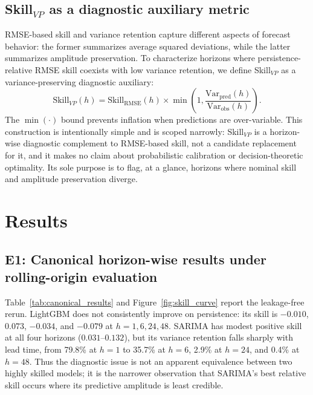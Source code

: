 \documentclass{article}
\begin{document}
\subsection{\texorpdfstring{Skill$_{VP}$}{SkillVP} as a diagnostic auxiliary metric}
\label{sec:method_skillvp}

RMSE-based skill and variance retention capture different aspects of forecast
behavior: the former summarizes average squared deviations, while the latter
summarizes amplitude preservation.
To characterize horizons where persistence-relative RMSE skill coexists with
low variance retention, we define Skill$_{VP}$ as a variance-preserving
diagnostic auxiliary:
\begin{equation}
  \mathrm{Skill}_{VP}(h) = \mathrm{Skill}_{\mathrm{RMSE}}(h)\times
  \min\!\left(1,\frac{\mathrm{Var}_{\mathrm{pred}}(h)}
  {\mathrm{Var}_{\mathrm{obs}}(h)}\right).
\end{equation}
The $\min(\cdot)$ bound prevents inflation when predictions are over-variable.
This construction is intentionally simple and is scoped narrowly: Skill$_{VP}$
is a horizon-wise diagnostic complement to RMSE-based skill, not a candidate
replacement for it, and it makes no claim about probabilistic calibration or
decision-theoretic optimality. Its sole purpose is to flag, at a glance,
horizons where nominal skill and amplitude preservation diverge.

\section{Results}

\subsection{E1: Canonical horizon-wise results under rolling-origin evaluation}

Table~\ref{tab:canonical_results} and Figure~\ref{fig:skill_curve} report the
leakage-free rerun.  LightGBM does not consistently improve on persistence:
its skill is $-0.010$, $0.073$, $-0.034$, and $-0.079$ at
$h=1,6,24,48$.  SARIMA has modest positive skill at all four horizons
($0.031$--$0.132$), but its variance retention falls sharply with lead time,
from 79.8\% at $h=1$ to 35.7\% at $h=6$, 2.9\% at $h=24$, and 0.4\% at
$h=48$.  Thus the diagnostic issue is not an apparent equivalence between two
highly skilled models; it is the narrower observation that SARIMA's best
relative skill occurs where its predictive amplitude is least credible.
\end{document}
